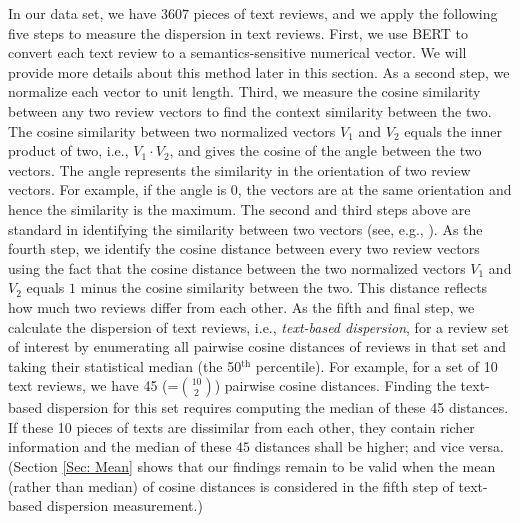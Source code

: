\documentclass[msom,blindrev]{informs3}
\begin{document}
	In our data set, we have $3607$ pieces of text reviews, and we apply the following five steps to measure the dispersion in text reviews. First, we use BERT to convert each text review to a semantics-sensitive numerical vector. We will provide more details about this method later in this section.  As a second step, we normalize each vector to unit length. Third, we measure the cosine similarity between any two review vectors to find the context similarity between the two. The cosine similarity between two normalized vectors $V_{1}$ and $V_{2}$ equals the inner product of two, i.e., $V_1 \cdot V_2$, and gives the cosine of the angle between the two vectors. The angle represents the similarity in the orientation of two review vectors. For example, if the angle is $0$, the vectors are at the same orientation and hence the similarity is the maximum. The second and third steps above are standard in identifying the similarity between two vectors (see, e.g., \cite{hoberg2016text}). As the fourth step, we identify the cosine distance between every two review vectors using the fact that the cosine distance between the two normalized vectors $V_{1}$ and $V_{2}$ equals $1$ minus the cosine similarity between the two. This distance reflects how much two reviews differ from each other. As the fifth and final step, we calculate the dispersion of text reviews, i.e., \emph{text-based dispersion}, for a review set of interest by enumerating all pairwise cosine distances of reviews in that set and taking their statistical median (the 50$^{\text{th}}$ percentile). For example, for a set of 10 text reviews, we have 45 (=$\binom{10}{2}$) pairwise cosine distances. Finding the text-based dispersion for this set requires computing the median of these 45 distances. If these 10 pieces of texts are dissimilar from each other, they contain richer information and the median of these $45$ distances shall be higher; and vice versa. (Section \ref{Sec: Mean} shows that our findings remain to be valid when the mean (rather than median) of cosine distances is considered in the fifth step of text-based dispersion measurement.)
	
\end{document}

